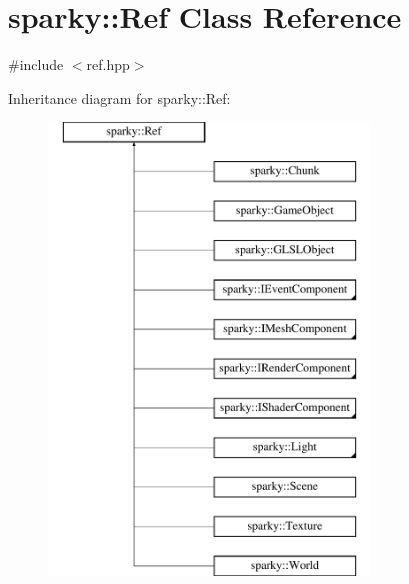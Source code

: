 \hypertarget{classsparky_1_1_ref}{}\section{sparky\+:\+:Ref Class Reference}
\label{classsparky_1_1_ref}


{\ttfamily \#include $<$ref.\+hpp$>$}

Inheritance diagram for sparky\+:\+:Ref\+:\begin{figure}[H]
\begin{center}
\leavevmode
\includegraphics[height=12.000000cm]{classsparky_1_1_ref}
\end{center}
\end{figure}
